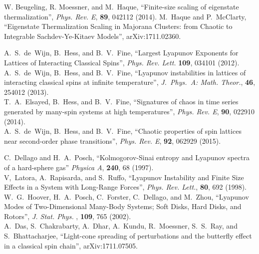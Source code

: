 \documentclass[a4paper, onecolumn]{revtex4-1}
\begin{document}
\begin{thebibliography}{1}
W. Beugeling, R. Moessner, and M.~Haque, 
``Finite-size scaling of eigenstate thermalization'', 
{\em Phys. Rev. E}, {\bf 89}, 042112 (2014). 
%
M.~Haque and P.~McClarty, ``Eigenstate Thermalization Scaling in Majorana Clusters: from Chaotic to
Integrable Sachdev-Ye-Kitaev Models'', arXiv:1711.02360.




A.~S.~de~Wijn, B.~Hess, and B.~V.~Fine, 
``Largest Lyapunov Exponents for Lattices of Interacting Classical Spins'', 
{\em Phys. Rev. Lett.} {\bf 109}, 034101 (2012). 
%
\\
%
A.~S.~de~Wijn, B.~Hess, and B.~V.~Fine, 
``Lyapunov instabilities in lattices of interacting classical spins at infinite temperature'', 
{\em J.~Phys.~A: Math. Theor.}, {\bf 46}, 254012 (2013). 
\\
%
T.~A.~Elsayed, B.~Hess, and B.~V.~Fine, 
``Signatures of chaos in time series generated by many-spin systems at high temperatures'',
{\em Phys. Rev. E}, {\bf 90}, 022910 (2014). 
%
\\
%
A.~S.~de~Wijn, B.~Hess, and B.~V.~Fine, 
``Chaotic properties of spin lattices near second-order phase transitions'',
{\em Phys. Rev. E}, {\bf 92}, 062929 (2015). 
%


C.~Dellago and H.~A.~Posch, 
``Kolmogorov-Sinai entropy and Lyapunov spectra of a hard-sphere gas''  
{\em Physica A},  {\bf 240}, 68 (1997).
%
\\
%
V,~Latora, A.~Rapisarda, and S.~Ruffo, 
``Lyapunov Instability and Finite Size Effects in a System with Long-Range Forces'', 
{\em Phys. Rev. Lett.}, {\bf 80}, 692 (1998). 
%
\\
%
W.~G.~Hoover, H.~A.~Posch, C.~Forster, C.~Dellago, and M.~Zhou, 
``Lyapunov Modes of Two-Dimensional Many-Body Systems; Soft Disks, Hard Disks, and Rotors'', 
{\em J. Stat. Phys.} , {\bf 109}, 765 (2002).
%
\\
%
A.~Das, S.~Chakrabarty, A.~Dhar, A.~Kundu, R.~Moessner, S.~S.~Ray, and S.~Bhattacharjee,
``Light-cone spreading of perturbations and the butterfly effect in a classical spin chain'',
arXiv:1711.07505.
    
    



\end{thebibliography}
\end{document}
